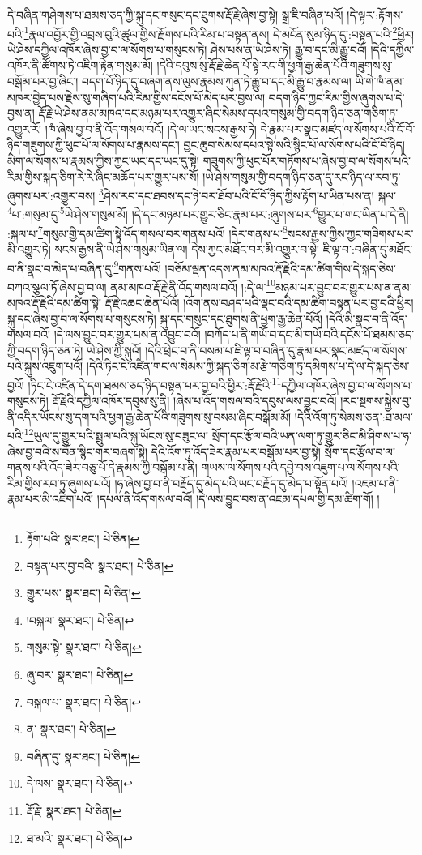 དེ་བཞིན་གཤེགས་པ་ཐམས་ཅད་ཀྱི་སྐུ་དང་གསུང་དང་ཐུགས་རྡོ་རྗེ་ཞེས་བྱ་སྟེ། སྒྲ་ཇི་བཞིན་པའོ། །དེ་ལྟར་:རྟོགས་པའི་\footnote{རྟོག་པའི་  སྣར་ཐང་།  པེ་ཅིན། }རྣལ་འབྱོར་གྱི་འབྲས་བུའི་ཚུལ་གྱིས་རྫོགས་པའི་རིམ་པ་བསྟན་ནས། དེ་མངོན་སུམ་ཉིད་དུ་:བསྟན་པའི་\footnote{བསྟན་པར་བྱ་བའི་  སྣར་ཐང་།  པེ་ཅིན། }ཕྱིར། ཡེ་ཤེས་དཀྱིལ་འཁོར་ཞེས་བྱ་བ་ལ་སོགས་པ་གསུངས་ཏེ། ཤེས་པས་ན་ཡེ་ཤེས་ཏེ། རྒྱུ་བ་དང་མི་རྒྱུ་བའོ། །དེའི་དཀྱིལ་འཁོར་ནི་ཚོགས་ཏེ་འཇིག་རྟེན་གསུམ་མོ། །དེའི་དབུས་སུ་རྡོ་རྗེ་ཆེན་པོ་སྟེ་རང་གི་ཕྱག་རྒྱ་ཆེན་པོའི་གཟུགས་སུ་བསྒོམ་པར་བྱ་ཞིང་། བདག་པོ་ཉིད་དུ་བཞག་ནས་ལུས་རྣམས་ཀུན་ཏེ་རྒྱུ་བ་དང་མི་རྒྱུ་བ་རྣམས་ལ། ཡི་གེ་ཁཾ་ནམ་མཁར་བྱེད་པས་རྗེས་སུ་གཞིག་པའི་རིམ་གྱིས་དངོས་པོ་མེད་པར་བྱས་ལ། བདག་ཉིད་ཀྱང་རིམ་གྱིས་ཞུགས་པ་དེ་བྱས་ན། རྡོ་རྗེ་ཡེ་ཤེས་ནམ་མཁའ་དང་མཉམ་པར་འགྱུར་ཞིང་སེམས་དཔའ་གསུམ་གྱི་བདག་ཉིད་ཅན་གཅིག་ཏུ་འགྱུར་རོ། །ཁཾ་ཞེས་བྱ་བ་ནི་འོད་གསལ་བའོ། །དེ་ལ་ཡང་སངས་རྒྱས་ཏེ། དེ་རྣམ་པར་སྣང་མཛད་ལ་སོགས་པའི་ངོ་བོ་ཉིད་གཟུགས་ཀྱི་ཕུང་པོ་ལ་སོགས་པ་རྣམས་དང་། བྱང་ཆུབ་སེམས་དཔའ་སྟེ་སའི་སྙིང་པོ་ལ་སོགས་པའི་ངོ་བོ་ཉིད། མིག་ལ་སོགས་པ་རྣམས་ཀྱིས་ཀྱང་ཡང་དང་ཡང་དུ་སྟེ། གཟུགས་ཀྱི་ཕུང་པོར་གཏོགས་པ་ཞེས་བྱ་བ་ལ་སོགས་པའི་རིམ་གྱིས་སྐད་ཅིག་རེ་རེ་ཞིང་མཆོད་པར་གྱུར་པས་སོ། །ཡེ་ཤེས་གསུམ་གྱི་བདག་ཉིད་ཅན་དུ་རང་ཉིད་ལ་རབ་ཏུ་ཞུགས་པར་:འགྱུར་བས། \footnote{གྱུར་པས་  སྣར་ཐང་།  པེ་ཅིན། }ཤེས་རབ་དང་ཐབས་དང་ཉེ་བར་ཐོབ་པའི་ངོ་བོ་ཉིད་ཀྱིས་རྟོག་པ་ཡིན་པས་ན། སྐལ་\footnote{།བསྐལ་  སྣར་ཐང་།  པེ་ཅིན། }པ་:གསུམ་དུ་\footnote{གསུམ་སྟེ་  སྣར་ཐང་།  པེ་ཅིན། }ཡེ་ཤེས་གསུམ་མོ། །དེ་དང་མཉམ་པར་གྱུར་ཅིང་རྣམ་པར་:ཞུགས་པར་\footnote{ཞུ་བར་  སྣར་ཐང་།  པེ་ཅིན། }གྱུར་པ་གང་ཡིན་པ་དེ་ནི། :སྐལ་པ་\footnote{བསྐལ་པ་  སྣར་ཐང་།  པེ་ཅིན། }གསུམ་གྱི་དམ་ཚིག་སྟེ་འོད་གསལ་བར་གནས་པའོ། །དེར་གནས་པ་\footnote{ན་  སྣར་ཐང་།  པེ་ཅིན། }སངས་རྒྱས་ཀྱིས་ཀྱང་གཟིགས་པར་མི་འགྱུར་ཏེ། སངས་རྒྱས་ནི་ཡེ་ཤེས་གསུམ་ཡིན་ལ། དེས་ཀྱང་མཐོང་བར་མི་འགྱུར་བ་སྟེ། ཇི་ལྟ་བ་:བཞིན་དུ་མཐོང་བ་ནི་སྣང་བ་མེད་པ་བཞིན་དུ་\footnote{བཞིན་དུ་  སྣར་ཐང་།  པེ་ཅིན། }གནས་པའོ། །བཅོམ་ལྡན་འདས་ནམ་མཁའ་རྡོ་རྗེའི་དམ་ཚིག་གིས་དེ་སྐད་ཅེས་བཀའ་སྩལ་ཏོ་ཞེས་བྱ་བ་ལ། ནམ་མཁའ་རྡོ་རྗེ་ནི་འོད་གསལ་བའོ། །:དེ་ལ་\footnote{དེ་ལས་  སྣར་ཐང་།  པེ་ཅིན། }མཉམ་པར་བྱུང་བར་གྱུར་པས་ན་ནམ་མཁའ་རྡོ་རྗེའི་དམ་ཚིག་སྟེ། རྡོ་རྗེ་འཆང་ཆེན་པོའོ། །འོག་ནས་བཤད་པའི་ལྡང་བའི་དམ་ཚིག་བསྟན་པར་བྱ་བའི་ཕྱིར། སྐུ་དང་ཞེས་བྱ་བ་ལ་སོགས་པ་གསུངས་ཏེ། སྐུ་དང་གསུང་དང་ཐུགས་ནི་ཕྱག་རྒྱ་ཆེན་པོའོ། །དེའི་མི་སྣང་བ་ནི་འོད་གསལ་བའོ། །དེ་ལས་བྱུང་བར་གྱུར་པས་ན་འབྱུང་བའོ། །བཀོད་པ་ནི་གཡོ་བ་དང་མི་གཡོ་བའི་དངོས་པོ་ཐམས་ཅད་ཀྱི་བདག་ཉིད་ཅན་ཏེ། ཡེ་ཤེས་ཀྱི་སྐུའོ། །དེའི་ཕྲེང་བ་ནི་བསམ་པ་ཇི་ལྟ་བ་བཞིན་དུ་རྣམ་པར་སྣང་མཛད་ལ་སོགས་པའི་སྐུས་འཇུག་པའོ། །དེའི་ཏིང་ངེ་འཛིན་གང་ལ་སེམས་ཀྱི་སྐད་ཅིག་མ་རྩེ་གཅིག་ཏུ་དམིགས་པ་དེ་ལ་དེ་སྐད་ཅེས་བྱའོ། །ཏིང་ངེ་འཛིན་དེ་དག་ཐམས་ཅད་ཉིད་བསྟན་པར་བྱ་བའི་ཕྱིར་:རྡོ་རྗེའི་\footnote{རྡོ་རྗེ་  སྣར་ཐང་།  པེ་ཅིན། }དཀྱིལ་འཁོར་ཞེས་བྱ་བ་ལ་སོགས་པ་གསུངས་ཏེ། རྡོ་རྗེའི་དཀྱིལ་འཁོར་དབུས་སུ་ནི། །ཞེས་པ་འོད་གསལ་བའི་དབུས་ལས་བྱུང་བའོ། །རང་སྔགས་སྐྱེས་བུ་ནི་འདིར་ཡོངས་སུ་དག་པའི་ཕྱག་རྒྱ་ཆེན་པོའི་གཟུགས་སུ་བསམ་ཞིང་བསྒོམ་མོ། །དེའི་འོག་ཏུ་སེམས་ཅན་:ཐ་མལ་པའི་\footnote{ཐ་མའི་  སྣར་ཐང་།  པེ་ཅིན། }ཡུལ་དུ་གྱུར་པའི་སྤྲུལ་པའི་སྐུ་ཡོངས་སུ་བཟུང་ལ། སྲོག་དང་རྩོལ་བའི་ཡན་ལག་ཏུ་གྱུར་ཅིང་མི་ཤིགས་པ་ཧ་ཞེས་བྱ་བའི་ས་བོན་སྙིང་གར་བཞག་སྟེ། དེའི་འོག་ཏུ་འོད་ཟེར་རྣམ་པར་བསྒོམ་པར་བྱ་སྟེ། སྲོག་དང་རྩོལ་བ་ལ་གནས་པའི་འོད་ཟེར་བཅུ་པོ་དེ་རྣམས་ཀྱི་བསྒོམ་པ་ནི། གཡས་ལ་སོགས་པའི་དབྱེ་བས་འཇུག་པ་ལ་སོགས་པའི་རིམ་གྱིས་རབ་ཏུ་ཞུགས་པའོ། །ཧ་ཞེས་བྱ་བ་ནི་བརྗོད་དུ་མེད་པའི་ཡང་བརྗོད་དུ་མེད་པ་སྟོན་པའོ། །འཇམ་པ་ནི་རྣམ་པར་མི་འཇིག་པའོ། །དཔལ་ནི་འོད་གསལ་བའོ། །དེ་ལས་བྱུང་བས་ན་འཇམ་དཔལ་གྱི་དམ་ཚིག་གོ། །
